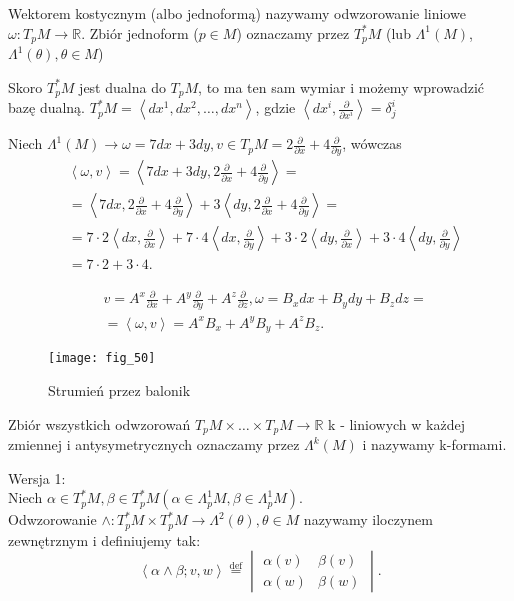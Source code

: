 \documentclass[../main.tex]{subfiles}
\begin{document}
    \begin{definicja}
        Wektorem kostycznym (albo jednoformą) nazywamy odwzorowanie liniowe  $\omega: T_pM\to\mathbb{R}$.
        Zbiór jednoform ($p\in M$) oznaczamy przez $T_p^* M$ (lub $\Lambda^1(M)$, $\Lambda^1(\theta), \theta\in M$)
    \end{definicja}
    Skoro $T_p^* M$ jest dualna do $T_pM$, to ma ten sam wymiar i możemy wprowadzić bazę dualną. $T_p^*M = \left< dx^1, dx^2, \ldots, dx^n \right>$, gdzie $\left<dx^i, \frac{\partial }{\partial x^i}  \right> = \delta^i_j$
    \begin{przyklad}
        Niech $\Lambda^1(M)\to\omega = 7dx + 3dy, v\in T_pM = 2 \frac{\partial }{\partial x} +4 \frac{\partial }{\partial y} $, wówczas
        \begin{align*}
            &\left<\omega,v \right> = \left<7dx+3dy,2 \frac{\partial }{\partial x} + 4 \frac{\partial }{\partial y}  \right> =\\
            &= \left<7dx, 2 \frac{\partial }{\partial x} + 4 \frac{\partial }{\partial y}  \right> + 3 \left< dy, 2 \frac{\partial }{\partial x} + 4 \frac{\partial }{\partial y}  \right> = \\
            &= 7\cdot 2\left<dx,\frac{\partial }{\partial x}  \right> + 7\cdot 4 \left<dx, \frac{\partial }{\partial y}  \right> + 3\cdot 2 \left<dy,\frac{\partial }{\partial x}\right> + 3\cdot 4 \left<dy , \frac{\partial }{\partial y} \right> \\
            &= 7\cdot 2+ 3\cdot 4
        .\end{align*}
    \end{przyklad}
    \begin{przyklad}
        \begin{align*}
            &v = A^x \frac{\partial }{\partial x} + A^y \frac{\partial }{\partial y} + A^z \frac{\partial }{\partial z} , \omega = B_xdx + B_ydy + B_zdz=\\
            &= \left<\omega,v \right> = A^xB_x + A^yB_y + A^zB_z
        .\end{align*}
    \end{przyklad}
    \begin{figure}
        \centering
        \texttt{[image: fig\_50]}
        \caption{Strumień przez balonik}
    \end{figure}
    \begin{definicja}
        Zbiór wszystkich odwzorowań $T_pM \times \ldots \times T_pM \to \mathbb{R}$ k - liniowych w każdej zmiennej i antysymetrycznych oznaczamy przez $\Lambda^k(M)$ i nazywamy k-formami.
    \end{definicja}
    Wersja 1:\\
    Niech $\alpha\in T_p^*M, \beta\in T_p^*M ( \alpha\in \Lambda_p^1 M, \beta \in \Lambda_p^1 M )$.\\
    Odwzorowanie $\land : T_p^* M \times T_p^* M \to \Lambda^2(\theta), \theta\in M$ nazywamy iloczynem zewnętrznym i definiujemy tak:
    \[
        \left<\alpha\land\beta;v,w \right> \overset{\text{def}}{=} \begin{vmatrix}\alpha(v)&\beta(v)\\ \alpha(w)&\beta(w) \end{vmatrix}
    .\]
\end{document}
